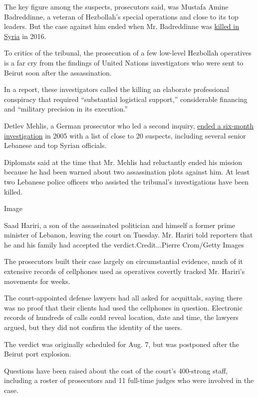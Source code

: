 The key figure among the suspects, prosecutors said, was Mustafa Amine
Badreddinne, a veteran of Hezbollah's special operations and close to
its top leaders. But the case against him ended when Mr. Badreddinne was
\href{https://www.nytimes3xbfgragh.onion/2016/05/14/world/middleeast/mustafa-badreddine-hezbollah.html}{killed
in Syria} in 2016.

To critics of the tribunal, the prosecution of a few low-level Hezbollah
operatives is a far cry from the findings of United Nations
investigators who were sent to Beirut soon after the assassination.

In a report, these investigators called the killing an elaborate
professional conspiracy that required ``substantial logistical
support,'' considerable financing and ``military precision in its
execution.''

Detlev Mehlis, a German prosecutor who led a second inquiry,
\href{https://www.nytimes3xbfgragh.onion/2005/12/14/international/middleeast/un-considers-widening-inquiry-into-lebanese-slaying.html}{ended
a six-month investigation} in 2005 with a list of close to 20 suspects,
including several senior Lebanese and top Syrian officials.

Diplomats said at the time that Mr. Mehlis had reluctantly ended his
mission because he had been warned about two assassination plots against
him. At least two Lebanese police officers who assisted the tribunal's
investigations have been killed.

Image

Saad Hariri, a son of the assassinated politician and himself a former
prime minister of Lebanon, leaving the court on Tuesday. Mr. Hariri told
reporters that he and his family had accepted the
verdict.Credit...Pierre Crom/Getty Images

The prosecutors built their case largely on circumstantial evidence,
much of it extensive records of cellphones used as operatives covertly
tracked Mr. Hariri's movements for weeks.

The court-appointed defense lawyers had all asked for acquittals, saying
there was no proof that their clients had used the cellphones in
question. Electronic records of hundreds of calls could reveal location,
date and time, the lawyers argued, but they did not confirm the identity
of the users.

The verdict was originally scheduled for Aug. 7, but was postponed after
the Beirut port explosion.

Questions have been raised about the cost of the court's 400-strong
staff, including a roster of prosecutors and 11 full-time judges who
were involved in the case.

